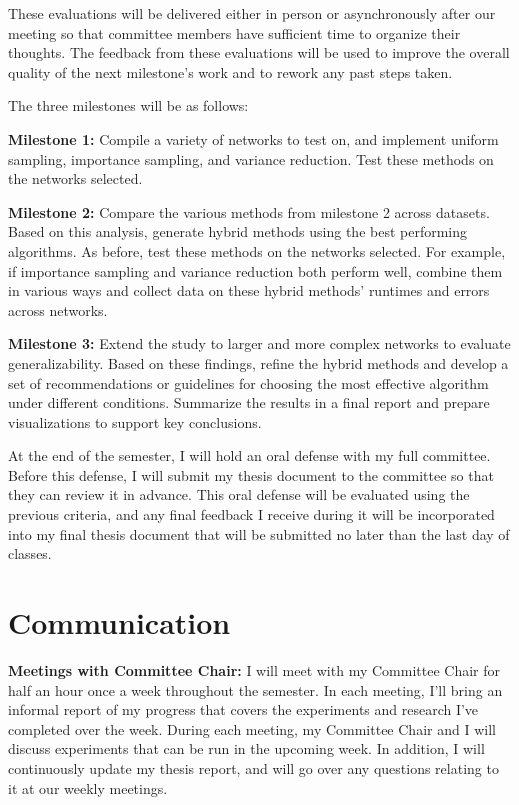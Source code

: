 \documentclass[11pt]{article}
\begin{document}
These evaluations will be delivered either in person or asynchronously after our meeting so that committee members have sufficient time to organize their thoughts.
The feedback from these evaluations will be used to improve the overall quality of the next milestone's work and to rework any past steps taken.

The three milestones will be as follows:

\textbf{Milestone 1:}
Compile a variety of networks to test on, and implement uniform sampling, importance sampling, and variance reduction.
Test these methods on the networks selected.

\textbf{Milestone 2:}
Compare the various methods from milestone 2 across datasets.
Based on this analysis, generate hybrid methods using the best performing algorithms.
As before, test these methods on the networks selected.
For example, if importance sampling and variance reduction both perform well, combine them in various ways and collect data on these hybrid methods' runtimes and errors across networks.

\textbf{Milestone 3:}
Extend the study to larger and more complex networks to evaluate generalizability.
Based on these findings, refine the hybrid methods and develop a set of recommendations or guidelines for choosing the most effective algorithm under different conditions.
Summarize the results in a final report and prepare visualizations to support key conclusions.

At the end of the semester, I will hold an oral defense with my full committee.
Before this defense, I will submit my thesis document to the committee so that they can review it in advance.
This oral defense will be evaluated using the previous criteria, and any final feedback I receive during it will be incorporated into my final thesis document that will be submitted no later than the last day of classes.

\section{Communication}

\textbf{Meetings with Committee Chair:} I will meet with my Committee Chair for half an hour once a week throughout the semester.
In each meeting, I’ll bring an informal report of my progress that covers the experiments and research I’ve completed over the week.
During each meeting, my Committee Chair and I will discuss experiments that can be run in the upcoming week.
In addition, I will continuously update my thesis report, and will go over any questions relating to it at our weekly meetings.
\end{document}
